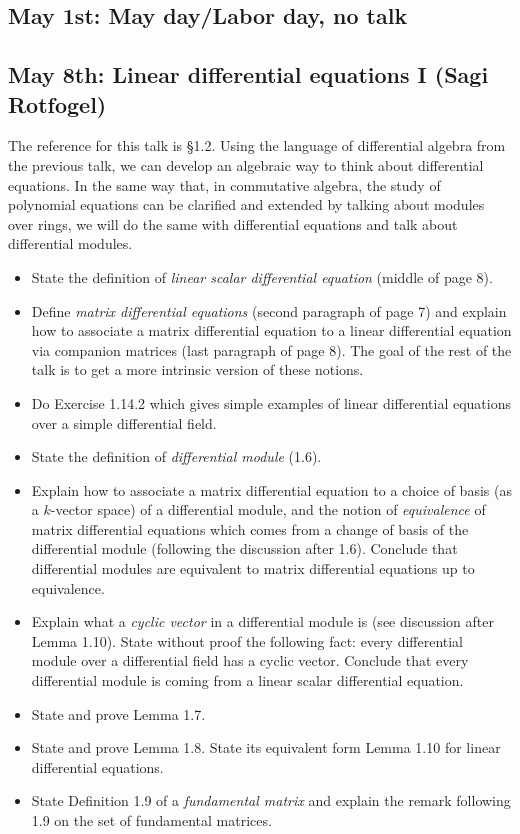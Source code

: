 \documentclass{amsart}
\theoremstyle{definition}
\theoremstyle{remark}
\begin{document}
\subsection{May 1st: May day/Labor day, no talk}

\subsection{May 8th: Linear differential equations I (Sagi Rotfogel)}

The reference for this talk is \S 1.2. Using the language of differential algebra from the previous talk, we can develop an algebraic way to think about differential equations. In the same way that, in commutative algebra, the study of polynomial equations can be clarified and extended by talking about modules over rings, we will do the same with differential equations and talk about differential modules.

\begin{itemize}
\item State the definition of \emph{linear scalar differential equation} (middle of page 8).
\item Define \emph{matrix differential equations} (second paragraph of page 7) and explain how to associate a matrix differential equation to a linear differential equation via companion matrices (last paragraph of page 8). The goal of the rest of the talk is to get a more intrinsic version of these notions. 
\item Do Exercise 1.14.2 which gives simple examples of linear differential equations over a simple differential field.  
\item State the definition of \emph{differential module} (1.6). 
\item Explain how to associate a matrix differential equation to a choice of basis (as a \(k\)-vector space) of a differential module, and the notion of \emph{equivalence} of matrix differential equations which comes from a change of basis of the differential module (following the discussion after 1.6). Conclude that differential modules are equivalent to matrix differential equations up to equivalence.
\item Explain what a \emph{cyclic vector} in a differential module is (see discussion after Lemma 1.10). State without proof the following fact: every differential module over a differential field has a cyclic vector. Conclude that every differential module is coming from a linear scalar differential equation.
\item State and prove Lemma 1.7.
\item State and prove Lemma 1.8. State its equivalent form Lemma 1.10 for linear differential equations.
\item State Definition 1.9 of a \emph{fundamental matrix} and explain the remark following 1.9 on the set of fundamental matrices.
\end{itemize}
\end{document}

